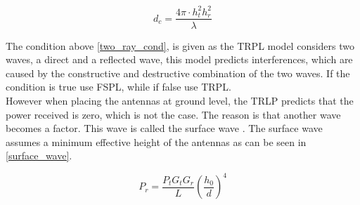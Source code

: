 \begin{equation}
d_{c} = \frac{4\pi \cdot h^2_t h^2_r }{\lambda}
\label{two_ray_cross_dis}
\end{equation}  

The condition above \eqref{two_ray_cond}, is given as the TRPL model considers two waves, a direct and a reflected wave, this model predicts interferences, which are caused by the constructive and destructive combination of the two waves. If the condition is true use   FSPL, while if false use TRPL.   %
\\










However when placing the antennas at ground level, the TRLP predicts that the power received is zero, which is not the case.
The reason is that another wave becomes a factor. This wave is called the surface wave \cite{Chong}. The surface wave assumes a minimum effective height of the antennas as can be seen in \eqref{surface_wave}. 

\begin{equation}
P_r=\frac{P_t G_t G_r }{L}\left(\frac{h_0}{d}\right)^4
\label{surface_wave}
\end{equation}

